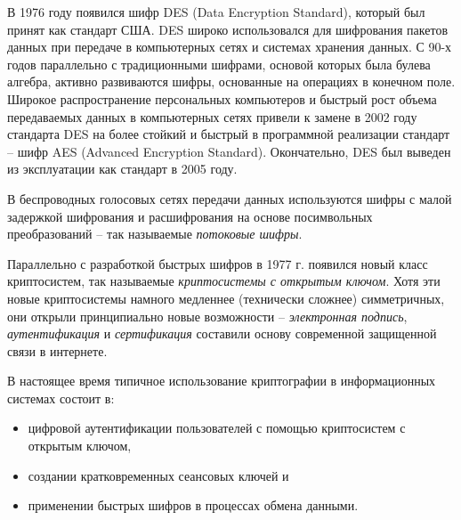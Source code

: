 В 1976 году появился шифр DES (Data Encryption Standard), который был принят как стандарт США. DES широко использовался для шифрования пакетов данных при передаче в компьютерных сетях и системах хранения данных. С 90-х годов параллельно с традиционными шифрами, основой которых была булева алгебра, активно развиваются шифры, основанные на операциях в конечном поле. Широкое распространение персональных компьютеров и быстрый рост объема передаваемых данных в компьютерных сетях привели к замене в 2002 году стандарта DES на более стойкий и быстрый в программной реализации стандарт -- шифр AES (Advanced Encryption Standard). Окончательно, DES был выведен из эксплуатации как стандарт в 2005 году.

В беспроводных голосовых сетях передачи данных используются шифры с малой задержкой шифрования и расшифрования на основе посимвольных преобразований -- так называемые \emph{потоковые шифры}.


Параллельно с разработкой быстрых шифров в 1977 г. появился новый класс криптосистем, так называемые \emph{криптосистемы с открытым ключом}. Хотя эти новые криптосистемы намного медленнее (технически сложнее) симметричных, они открыли принципиально новые возможности --  \emph{электронная подпись}, \emph{аутентификация} и \emph{сертификация} составили основу современной защищенной связи в интернете.

В настоящее время типичное использование криптографии в информационных системах состоит в:
\begin{itemize}
\item цифровой аутентификации пользователей с помощью криптосистем с открытым ключом,
\item создании кратковременных сеансовых ключей и
\item применении быстрых шифров в процессах обмена данными.
\end{itemize}
